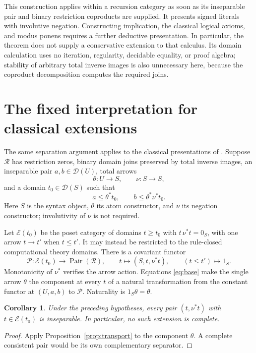 \documentclass[11pt]{article}
\newtheorem{corollary}[theorem]{Corollary}
\newcommand{\R}{\mathscr R}
\newcommand{\D}{\mathscr D}
\newcommand{\Pair}{\operatorname{Pair}}
\begin{document}
This construction applies within a recursion category as soon as its
inseparable pair and binary restriction coproducts are supplied.
It presents signed literals with involutive negation. Constructing
implication, the classical logical axioms, and modus ponens requires a
further deductive presentation. In particular, the theorem does not
supply a conservative extension to that calculus. Its domain calculation
uses no iteration, regularity, decidable equality, or proof algebra;
stability of arbitrary total inverse images is also unnecessary here,
because the coproduct decomposition computes the required joins.

\section{The fixed interpretation for classical extensions}

The same separation argument applies to the classical presentations of
\cite{Domains,General,Iteration}. Suppose $\R$ has restriction zeros,
binary domain joins preserved by total inverse images, an inseparable
pair $a,b\in\D(U)$, total arrows
\[
 \theta:U\to S,\qquad \nu:S\to S,
\]
and a domain $t_0\in\D(S)$ such that
\begin{equation}\label{eq:base}
 a\le\theta^*t_0,\qquad b\le\theta^*\nu^*t_0.
\end{equation}
Here $S$ is the syntax object, $\theta$ its atom constructor, and
$\nu$ its negation constructor; involutivity of $\nu$ is not required.

Let $\mathcal E(t_0)$ be the poset category of domains $t\ge t_0$
with $t\,\nu^*t=0_S$, with one arrow $t\to t'$ when $t\le t'$.
It may instead be restricted to the rule-closed computational theory
domains. There is a covariant functor
\[
 \mathcal P:\mathcal E(t_0)\longrightarrow\Pair(\R),\qquad
 t\longmapsto(S,t,\nu^*t),\qquad (t\le t')\longmapsto1_S.
\]
Monotonicity of $\nu^*$ verifies the arrow action. Equations
\eqref{eq:base} make the single arrow $\theta$ the component at every
$t$ of a natural transformation from the constant functor at $(U,a,b)$
to $\mathcal P$. Naturality is $1_S\theta=\theta$.

\begin{corollary}\label{cor:classical}
Under the preceding hypotheses, every pair $(t,\nu^*t)$ with
$t\in\mathcal E(t_0)$ is inseparable. In particular, no such
extension is complete.
\end{corollary}
\begin{proof}
Apply Proposition~\ref{prop:transport} to the component $\theta$.
A complete consistent pair would be its own complementary separator.
\end{proof}
\end{document}
